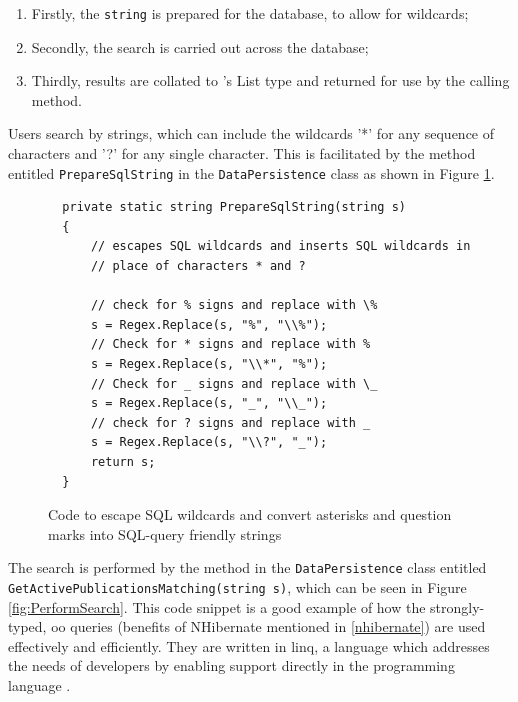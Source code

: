 \begin{enumerate}
	\item Firstly, the \texttt{string} is prepared for the database, to allow for wildcards;
	\item Secondly, the search is carried out across the database;
	\item Thirdly, results are collated to \cs's List type and returned for use by the calling method.
\end{enumerate}

Users search by strings, which can include the wildcards '*' for any sequence of characters and '?' for any single character.
This is facilitated by the method entitled \texttt{PrepareSqlString} in the \texttt{DataPersistence} class as shown in Figure \ref{fig:SQLsearchEscape}.

\begin{figure}
	\begin{center}
			\lstset{language=CSharp} 
			\begin{lstlisting}
  private static string PrepareSqlString(string s)
  {
      // escapes SQL wildcards and inserts SQL wildcards in
      // place of characters * and ?
      
      // check for % signs and replace with \%
      s = Regex.Replace(s, "%", "\\%");
      // Check for * signs and replace with %
      s = Regex.Replace(s, "\\*", "%");
      // Check for _ signs and replace with \_
      s = Regex.Replace(s, "_", "\\_");
      // check for ? signs and replace with _
      s = Regex.Replace(s, "\\?", "_");
      return s;
  }
  		\end{lstlisting}
		\caption{Code to escape SQL wildcards and convert asterisks and question marks into SQL-query friendly strings}
		\label{fig:SQLsearchEscape}
	\end{center}
\end{figure}

The search is performed by the method in the \texttt{DataPersistence} class entitled \texttt{GetActivePublicationsMatching(string s)}, which can be seen in Figure \ref{fig:PerformSearch}.  This code snippet is a good example of how the strongly-typed, \gls{oo} queries (benefits of NHibernate mentioned in \ref{nhibernate}) are used effectively and efficiently.  They are written in \gls{linq}, a language which addresses the needs of developers by enabling support directly in the programming language \cite{csUnleashed}.

